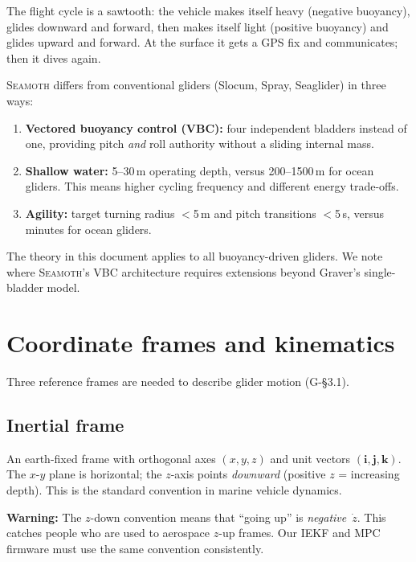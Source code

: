 \documentclass[11pt,a4paper]{article}
\newcommand{\seamoth}{\textsc{Seamoth}}
\newcommand{\vect}[1]{\bm{#1}}
\newcommand{\warning}[1]{\par\smallskip\noindent\colorbox{red!8}{\parbox{\dimexpr\linewidth-2\fboxsep}{%
  \small\textbf{Warning:} #1}}\smallskip}
\begin{document}
The flight cycle is a sawtooth: the vehicle makes itself heavy (negative buoyancy),
glides downward and forward, then makes itself light (positive buoyancy) and glides
upward and forward.  At the surface it gets a GPS fix and communicates; then it dives
again.

\seamoth{} differs from conventional gliders (Slocum, Spray, Seaglider) in three ways:
\begin{enumerate}[nosep]
  \item \textbf{Vectored buoyancy control (VBC):} four independent bladders instead
    of one, providing pitch \emph{and} roll authority without a sliding internal mass.
  \item \textbf{Shallow water:} 5--30\,m operating depth, versus 200--1500\,m for
    ocean gliders.  This means higher cycling frequency and different energy trade-offs.
  \item \textbf{Agility:} target turning radius $<$5\,m and pitch transitions $<$5\,s,
    versus minutes for ocean gliders.
\end{enumerate}

The theory in this document applies to all buoyancy-driven gliders.  We note
where \seamoth{}'s VBC architecture requires extensions beyond Graver's single-bladder model.


\section{Coordinate frames and kinematics}
\label{sec:kinematics}

Three reference frames are needed to describe glider motion (G-\S3.1).

\subsection{Inertial frame}

An earth-fixed frame with orthogonal axes $(x,y,z)$ and unit vectors
$(\vect{i},\vect{j},\vect{k})$.  The $x$-$y$ plane is horizontal; the $z$-axis
points \emph{downward} (positive $z$ = increasing depth).  This is the standard
convention in marine vehicle dynamics.

\warning{The $z$-down convention means that ``going up'' is \emph{negative}~$\dot{z}$.
This catches people who are used to aerospace $z$-up frames.  Our IEKF and MPC firmware
must use the same convention consistently.}
\end{document}
